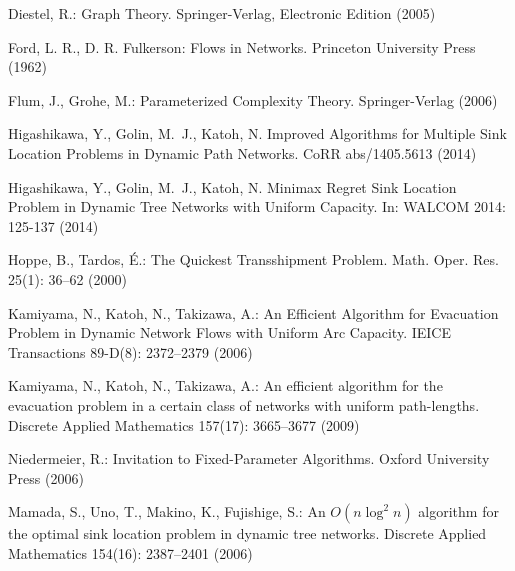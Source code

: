 \documentclass[a4paper,10pt]{llncs}
\begin{document}
\begin{thebibliography}{10}

Diestel, R.:
\newblock Graph Theory.
\newblock Springer-Verlag, Electronic Edition (2005)

Ford, L. R., D. R. Fulkerson:
Flows in Networks.
Princeton University Press (1962)

Flum, J., Grohe, M.:
Parameterized Complexity Theory.
Springer-Verlag (2006)

Higashikawa, Y., Golin, M.~J., Katoh, N.
Improved Algorithms for Multiple Sink Location Problems in Dynamic Path Networks.
CoRR abs/1405.5613 (2014)

Higashikawa, Y., Golin, M.~J., Katoh, N.
Minimax Regret Sink Location Problem in Dynamic Tree Networks with Uniform Capacity.
In: WALCOM 2014: 125-137 (2014)

Hoppe, B., Tardos, \'E.:
The Quickest Transshipment Problem.
Math. Oper. Res. 25(1): 36--62 (2000)

Kamiyama, N., Katoh, N., Takizawa, A.:
An Efficient Algorithm for Evacuation Problem in Dynamic Network Flows with Uniform Arc Capacity.
IEICE Transactions 89-D(8): 2372--2379 (2006)

Kamiyama, N., Katoh, N., Takizawa, A.:
An efficient algorithm for the evacuation problem in a certain class of networks with uniform path-lengths.
Discrete Applied Mathematics 157(17): 3665--3677 (2009)

Niedermeier, R.:
Invitation to Fixed-Parameter Algorithms.
Oxford University Press (2006)

Mamada, S., Uno, T., Makino, K., Fujishige, S.:
An $O(n \log^2n)$ algorithm for the optimal sink location problem in dynamic tree networks.
Discrete Applied Mathematics 154(16): 2387--2401 (2006)

\end{thebibliography}
\end{document}
